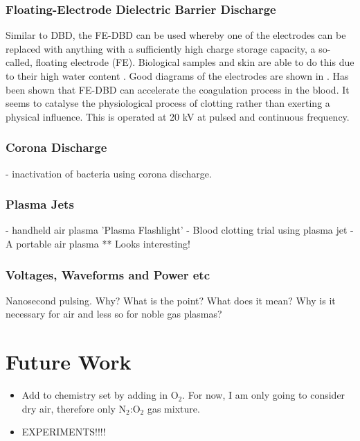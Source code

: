 \documentclass[11pt, oneside]{article}   	%
\begin{document}
\subsubsection{Floating-Electrode Dielectric Barrier Discharge}
Similar to DBD, the FE-DBD can be used whereby one of the electrodes can be replaced with anything with a sufficiently high charge storage capacity, a so-called, floating electrode (FE). 
Biological samples and skin are able to do this due to their high water content {\cite{Fridman2006blood}}.
Good diagrams of the electrodes are shown in {\cite{Fridman2006blood}}.
Has been shown that FE-DBD can accelerate the coagulation process in the blood. It seems to catalyse the physiological process of clotting rather than exerting a physical influence.
This is operated at 20 kV at pulsed and continuous frequency.

\subsubsection{Corona Discharge}
\cite{Dobrynin2011inactivation} - inactivation of bacteria using corona discharge.

\subsubsection{Plasma Jets}
\cite{Pei2012inactivation} - handheld air plasma 'Plasma Flashlight'
\cite{Chen2009blood} - Blood clotting trial using plasma jet
\cite{Walsh2011portable} - A portable air plasma ** Looks interesting!


\subsubsection{Voltages, Waveforms and Power etc}

Nanosecond pulsing.
Why? What is the point? What does it mean? Why is it necessary for air and less so for noble gas plasmas?



\section{Future Work}
\begin{itemize}
\item Add to chemistry set by adding in O$_2$. For now, I am only going to consider dry air, therefore only N$_2$:O$_2$ gas mixture.
\item EXPERIMENTS!!!!
\end{itemize}



\scriptsize


\end{document}
